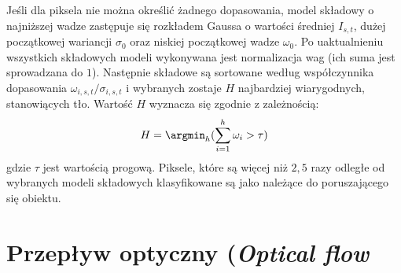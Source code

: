 Jeśli dla piksela nie można określić żadnego dopasowania, model składowy o najniższej wadze zastępuje się rozkładem Gaussa o wartości średniej $I_{s,t}$, dużej początkowej wariancji $\sigma_0$ oraz niskiej początkowej wadze $\omega_0$. Po uaktualnieniu wszystkich składowych modeli wykonywana jest normalizacja wag (ich suma jest sprowadzana do $1$). Następnie składowe są sortowane według współczynnika dopasowania $\omega_{i,s,t}/\sigma_{i,s,t}$ i wybranych zostaje $H$ najbardziej wiarygodnych, stanowiących tło. Wartość $H$ wyznacza się  zgodnie z zależnością:
\begin{equation}
	H = \argmin_h(\sum_{i=1}^h\omega_i > \tau)
\end{equation}
gdzie $\tau$ jest wartością progową. Piksele, które są więcej niż $2,5$ razy odległe od wybranych modeli składowych klasyfikowane są jako należące do poruszającego się obiektu.


\section{Przepływ optyczny (\textit{Optical flow}}
\label{sec:OpticalFlow}
